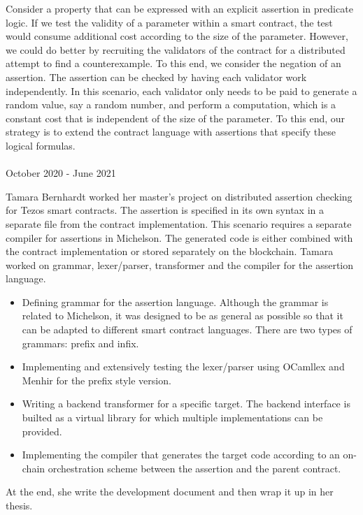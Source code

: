 \documentclass[a4paper,11pt]{article}
\begin{document}
Consider a property that can be expressed with an explicit assertion in predicate logic. If we test the validity of a parameter within a smart contract, the test would consume additional cost according to the size of the parameter. However, we could do better by recruiting the validators of the contract for a distributed attempt to find a counterexample. To this end, we consider the negation of an assertion. The assertion can be checked by having each validator work independently. In this scenario, each validator only needs to be paid to generate a random value, say a random number, and perform a computation, which is a constant cost that is independent of the size of the parameter. To this end, our strategy is to extend the contract language with assertions that specify these logical formulas.
\\
\\
October 2020 - June 2021

Tamara Bernhardt worked her master's project on distributed assertion checking for Tezos smart contracts. The assertion is specified in its own syntax in a separate file from the contract implementation. This scenario requires a separate compiler for assertions in Michelson. The generated code is either combined with the contract implementation or stored separately on the blockchain. Tamara worked on grammar, lexer/parser, transformer and the compiler for the assertion language. 
\begin{itemize}
\item Defining grammar for the assertion language. Although the grammar is related to Michelson, it was designed to be as general as possible so that it can be adapted to different smart contract languages. There are two types of grammars: prefix and infix.
\item Implementing and extensively testing the lexer/parser using OCamllex and Menhir for the prefix style version.
\item Writing a backend transformer for a specific target. The backend interface is builted as a virtual library for which multiple implementations can be provided.
\item Implementing the compiler that generates the target code according to an on-chain orchestration scheme between the assertion and the parent contract.
\end{itemize}
At the end, she write the development document and then wrap it up in her thesis.
\end{document}
